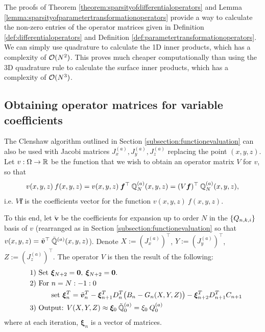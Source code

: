 \documentclass[11pt, oneside]{article}   	%
\begin{document}
The proofs of Theorem \ref{theorem:sparsityofdifferentialoperators} and Lemma \ref{lemma:sparsityofparametertransformationoperators} provide a way to calculate the non-zero entries of the operator matrices given in Definition \ref{def:differentialoperators} and Definition \ref{def:parametertransformationoperators}. We can simply use quadrature to calculate the 1D inner products, which has a complexity of $\mathcal{O}(N^2)$. This proves much cheaper computationally than using the 3D quadrature rule to calculate the surface inner products, which has a complexity of $\mathcal{O}(N^3)$.


\subsection{Obtaining operator matrices for variable coefficients}\label{subsection:operatorclenshaw}

The Clenshaw algorithm outlined in Section \ref{subsection:functionevaluation} can also be used with Jacobi matrices $J^{(a)}_x, J^{(a)}_y, J^{(a)}_z$ replacing the point $(x,y,z)$. Let $v : \Omega \to \mathbb{R}$ be the function that we wish to obtain an operator matrix $V$ for $v$, so that
\begin{align*}
	v(x,y,z) \: f(x,y,z) = v(x,y,z) \: \bm{f}^\top \: {\mathbb{Q}}^{(a)}_{N}(x,y,z) = (V \bm{f})^\top \: {\mathbb{Q}}^{(a)}_{N}(x,y,z),
\end{align*}
i.e. $V \bm{f}$ is the coefficients vector for the function $v(x,y,z) \: f(x,y,z)$. 

To this end, let $\tilde{\bm{v}}$ be the coefficients for expansion up to order $N$ in the $\{Q_{n,k,i}\}$ basis of $v$ (rearranged as in Section \ref{subsection:functionevaluation} so that $v(x,y,z) = \tilde{\bm{v}}^\top \: \mathbb{\tilde{Q}}^{(a)}(x,y,z)$). Denote $X := (J_x^{(a)})^\top$, $Y := (J_y^{(a)})^\top$, $Z := (J_z^{(a)})^\top$. The operator $V$ is then the result of the following:
\begin{align*}
	\quad &\text{1) } \text{Set } \bm{\xi}_{N+2} = \bold{0}, \: \bm{\xi}_{N+2} = \bold{0}. \\
	\quad &\text{2) } \text{For } n = N:-1:0 \\
	\quad & \quad \quad \quad \text{set } \bm{\xi}_{n}^T = {\tilde{\bm{v}}_n}^T - \bm{\xi}_{n+1}^T D^T_n \big(B_n - G_n(X, Y, Z)\big) -  \bm{\xi}_{n+2}^T D^T_{n+1}C_{n+1} \\
	\quad &\text{3) } \text{Output: } V(X, Y, Z) \approx \bm{\xi}_{0} \: \mathbb{\tilde{Q}}^{(a)}_{0}  = \xi_{0} \: Q^{(a)}_0
\end{align*}
where at each iteration, $\bm{\xi}_n$ is a vector of matrices.
\end{document}
